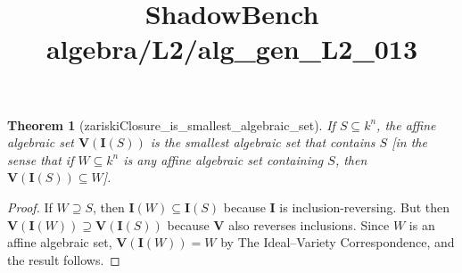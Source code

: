 \documentclass{article}
\title{ShadowBench algebra/L2/alg\_gen\_L2\_013}
\newtheorem{theorem}{Theorem}
\begin{document}
\maketitle

\begin{theorem}[zariskiClosure_is_smallest_algebraic_set]
If $S \subseteq k^n$, the affine algebraic set $\mathbf{V}(\mathbf{I}(S))$ is the \emph{smallest algebraic set that contains} $S$ [in the sense that if $W \subseteq k^n$ is any affine algebraic set containing $S$, then $\mathbf{V}(\mathbf{I}(S)) \subseteq W$].
\end{theorem}

\begin{proof}
If $W \supseteq S$, then $\mathbf{I}(W) \subseteq \mathbf{I}(S)$ because $\mathbf{I}$ is inclusion-reversing. But then $\mathbf{V}(\mathbf{I}(W)) \supseteq \mathbf{V}(\mathbf{I}(S))$ because $\mathbf{V}$ also reverses inclusions. Since $W$ is an affine algebraic set, $\mathbf{V}(\mathbf{I}(W)) = W$ by The Ideal–Variety Correspondence, and the result follows.
\end{proof}
\end{document}
